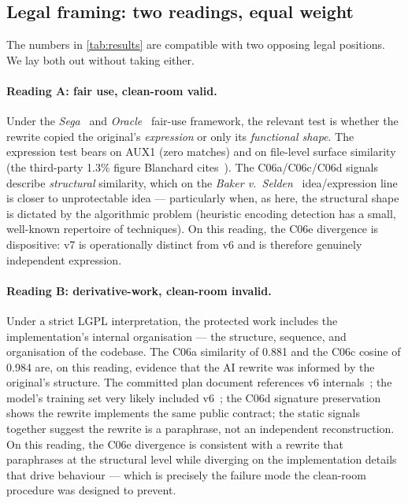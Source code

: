 \documentclass[11pt,letterpaper]{article}
\begin{document}
\subsection{Legal framing: two readings, equal weight}
\label{sec:legal}

The numbers in \cref{tab:results} are compatible with two opposing
legal positions. We lay both out without taking either.

\paragraph{Reading A: fair use, clean-room valid.} Under the
\emph{Sega}~\cite{segavsaccolade1992} and
\emph{Oracle}~\cite{googlevsoracle2021} fair-use framework, the
relevant test is whether the rewrite copied the original's
\emph{expression} or only its \emph{functional shape}. The expression
test bears on AUX1 (zero matches) and on file-level surface
similarity (the third-party 1.3\% figure Blanchard
cites~\cite{lwn2026chardet}). The C06a/C06c/C06d signals describe
\emph{structural} similarity, which on the \emph{Baker
v.\ Selden}~\cite{bakervseldon1880} idea/expression line is closer to
unprotectable idea --- particularly when, as here, the structural
shape is dictated by the algorithmic problem (heuristic encoding
detection has a small, well-known repertoire of techniques). On this
reading, the C06e divergence is dispositive: v7 is operationally
distinct from v6 and is therefore genuinely independent expression.

\paragraph{Reading B: derivative-work, clean-room invalid.} Under a
strict LGPL interpretation, the protected work includes the
implementation's internal organisation --- the structure, sequence,
and organisation of the codebase. The C06a similarity of 0.881 and
the C06c cosine of 0.984 are, on this reading, evidence that the AI
rewrite was informed by the original's structure. The committed
plan document references v6 internals~\cite{willison2026chardet};
the model's training set very likely included
v6~\cite{carlini2023quantifying,theregister2026chardet}; the C06d
signature preservation shows the rewrite implements the same public
contract; the static signals together suggest the rewrite is a
paraphrase, not an independent reconstruction. On this reading, the
C06e divergence is consistent with a rewrite that paraphrases at the
structural level while diverging on the implementation details that
drive behaviour --- which is precisely the failure mode the
clean-room procedure was designed to prevent.
\end{document}
